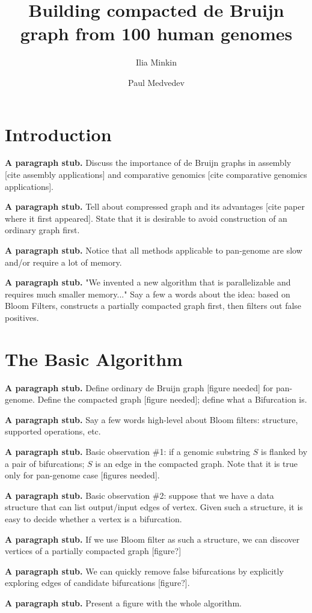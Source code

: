 \documentclass{llncs}
\title{Building compacted de Bruijn graph from 100 human genomes}
\author{Ilia Minkin\inst{1} \and Paul Medvedev\inst{1}}
\institute{Department of Computer Science and Engineering, The Pennsylvania State University, USA}
\newcommand{\stub}{\textbf{A paragraph stub. }}
\begin{document}
\maketitle
\section{Introduction}

\stub Discuss the importance of de Bruijn graphs \cite{bruijn1946combinatorial} in assembly [cite assembly applications]  and comparative genomics [cite comparative genomics applications].

\stub Tell about compressed graph and its  advantages [cite paper where it first appeared].
State that it is desirable to avoid construction of an ordinary graph first.

\stub Notice that all methods applicable to pan-genome are slow and/or require a lot of memory.

\stub "We invented a new algorithm that is parallelizable and requires much smaller memory..." 
Say a few a words about the idea: based on Bloom Filters, constructs a partially compacted graph first, then filters out false positives.

\section{The Basic Algorithm}
\stub Define ordinary de Bruijn graph [figure needed] for pan-genome.
Define the compacted graph [figure needed]; define what a Bifurcation is.

\stub Say a few words high-level about Bloom filters: structure, supported operations, etc.

\stub Basic observation \#1: if a genomic substring $S$ is flanked by a pair of bifurcations; $S$ is an edge in the compacted graph.
Note that it is true only for pan-genome case [figures needed].

\stub Basic observation \#2: suppose that we have a data structure that can list output/input edges of vertex.
Given such a structure, it is easy to decide whether a vertex is a bifurcation.

\stub If we use Bloom filter as such a structure, we can discover vertices of a partially compacted graph [figure?]

\stub We can quickly remove false bifurcations by explicitly exploring edges of candidate bifurcations  [figure?].

\stub Present a figure with the whole algorithm.
\end{document}
